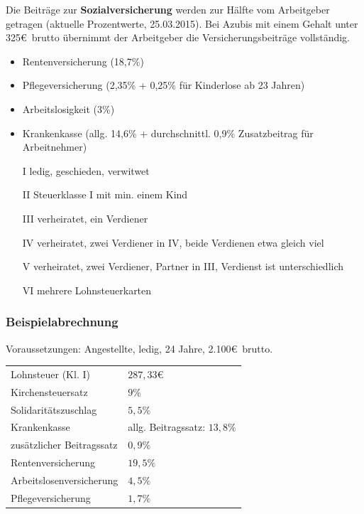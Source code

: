 \noindent Die Beiträge zur {\bf Sozialversicherung} werden zur Hälfte vom Arbeitgeber getragen (aktuelle Prozentwerte, 25.03.2015). Bei Azubis mit einem Gehalt unter 325\euro\ brutto übernimmt der Arbeitgeber die Versicherungsbeiträge vollständig.
\begin{itemize}
\setlength\itemsep{0em}
	\item Rentenversicherung (18,7\%)
	\item Pflegeversicherung (2,35\% + 0,25\% für Kinderlose ab 23 Jahren)
	\item Arbeitslosigkeit (3\%)
	\item Krankenkasse (allg. 14,6\% + durchschnittl. 0,9\% Zusatzbeitrag für Arbeitnehmer)
\end{itemize}

\begin{itemize}
\setlength\itemsep{0em}
	\item[I]		ledig, geschieden, verwitwet
	\item[II]	Steuerklasse I mit min. einem Kind
	\item[III]	verheiratet, ein Verdiener
	\item[IV]	verheiratet, zwei Verdiener in IV, beide Verdienen etwa gleich viel
	\item[V]		verheiratet, zwei Verdiener, Partner in III, Verdienst ist unterschiedlich
	\item[VI]	mehrere Lohnsteuerkarten
\end{itemize}

\subsubsection{Beispielabrechnung}

Voraussetzungen: Angestellte, ledig, 24 Jahre, 2.100\euro\ brutto.\\
\begin{tabular}{ll}
Lohnsteuer (Kl. I)			& $287,33$\euro\\
Kirchensteuersatz 			& $9\%$\\
Solidaritätszuschlag			& $5,5\%$\\
Krankenkasse					& allg. Beitragssatz: $13,8\%$\\
zusätzlicher Beitragssatz	& $0,9\%$\\
Rentenversicherung			& $19,5\%$\\
Arbeitslosenversicherung		& $4,5\%$\\
Pflegeversicherung			& $1,7\%$\\
\end{tabular}\newline

